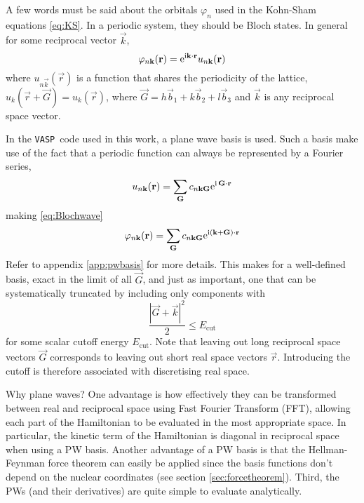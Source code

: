 \documentclass[11pt,bibliography=totoc,index=totoc]{scrbook}   %
\newcommand{\vasp}{{\texttt{VASP}}} %
\begin{document}
A few words must be said about the orbitals $\varphi_n$ used in the Kohn-Sham equations \eqref{eq:KS}.
In a periodic system, they should be Bloch states. In general for some reciprocal vector $\vec{k}$,
\begin{equation}
    \varphi_{n\boldsymbol{\mathrm{k}}}(\boldsymbol{\mathrm{r}}) = \mathrm{e}^{\mathrm{i}\boldsymbol{\mathrm{k}}\cdot\boldsymbol{\mathrm{r}}} u_{n\boldsymbol{\mathrm{k}}}(\boldsymbol{\mathrm{r}})
  \label{eq:Blochwave}
\end{equation}
where $u_{n\vec{k}}(\vec{r})$ is a function that shares the periodicity of the lattice, $u_k(\vec{r}+\vec{G}) = u_k(\vec{r})$,
where $\vec{G} = h\vec{b}_1 + k\vec{b}_2 + l\vec{b}_3$ and $\vec{k}$ is any reciprocal space vector.

In the \vasp\ code used in this work, a plane wave basis is used.
Such a basis make use of the fact that a periodic function can always be represented by a Fourier series, 
\begin{equation}
    u_{n\boldsymbol{\mathrm{k}}}(\boldsymbol{\mathrm{r}}) = \sum_{\boldsymbol{\mathrm{G}}} c_{n\boldsymbol{\mathrm{k}}\boldsymbol{\mathrm{G}}} \mathrm{e}^{\mathrm{i}\,\boldsymbol{\mathrm{G}}\cdot\boldsymbol{\mathrm{r}}}
\end{equation}
making \eqref{eq:Blochwave}
\begin{equation}
    \varphi_{n\boldsymbol{\mathrm{k}}}(\boldsymbol{\mathrm{r}}) = \sum_{\boldsymbol{\mathrm{G}}} c_{n\boldsymbol{\mathrm{k}}\boldsymbol{\mathrm{G}}} \mathrm{e}^{\mathrm{i}(\boldsymbol{\mathrm{k}}+\boldsymbol{\mathrm{G}})\cdot\boldsymbol{\mathrm{r}}}
  \label{eq:pwbasis}
\end{equation}
Refer to appendix \ref{app:pwbasis} for more details.
This makes for a well-defined basis, exact in the limit of all $\vec{G}$, and just as important, 
one that can be systematically truncated by including only components with 
\begin{equation}
  \frac{|\vec{G}+\vec{k}|^2}{2} \leq E_{\text{cut}}
\end{equation}
for some scalar cutoff energy $E_{\text{cut}}$. 
Note that leaving out long reciprocal space vectors $\vec{G}$ corresponds to leaving out short real space vectors $\vec{r}$. 
Introducing the cutoff is therefore associated with discretising real space.

Why plane waves?
One advantage is how effectively they can be transformed between real and reciprocal space using Fast Fourier Transform (FFT),
allowing each part of the Hamiltonian to be evaluated in the most appropriate space.
In particular, the kinetic term of the Hamiltonian is diagonal in reciprocal space when using a PW basis.
Another advantage of a PW basis is that the Hellman-Feynman force theorem can easily be applied since the basis functions don't depend on the nuclear coordinates (see section \ref{sec:forcetheorem}). 
Third, the PWs (and their derivatives) are quite simple to evaluate analytically.\cite[187]{Kohanoff:2006}
\end{document}
